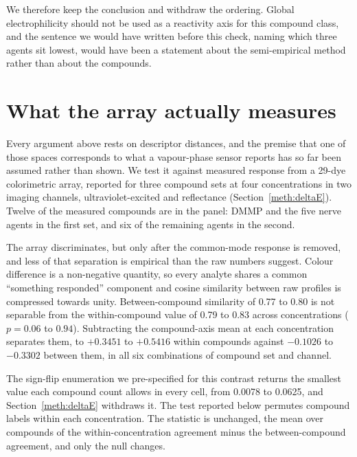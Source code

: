 \documentclass[journal=jacsat,manuscript=suppinfo,margin=1in]{achemso}
\begin{document}
We therefore keep the conclusion and withdraw the ordering. Global
electrophilicity should not be used as a reactivity axis for this compound
class, and the sentence we would have written before this check, naming which
three agents sit lowest, would have been a statement about the semi-empirical
method rather than about the compounds.

\section{What the array actually measures}
\label{res:arraydetail}

Every argument above rests on descriptor distances, and the premise that one of
those spaces corresponds to what a vapour-phase sensor reports has so far been
assumed rather than shown. We test it against measured response from a
29-dye colorimetric array, reported for three compound sets at four
concentrations in two imaging channels, ultraviolet-excited and reflectance
(Section~\ref{meth:deltaE}). Twelve of the measured compounds are in the panel:
DMMP and the five nerve agents in the first set, and six of the remaining agents
in the second.

The array discriminates, but only after the common-mode response is removed, and
less of that separation is empirical than the raw numbers suggest. Colour
difference is a non-negative quantity, so every analyte shares a common
``something responded'' component and cosine similarity between raw profiles is
compressed towards unity. Between-compound similarity of 0.77 to 0.80 is not
separable from the within-compound value of 0.79 to 0.83 across concentrations
($p = 0.06$ to $0.94$). Subtracting the compound-axis mean at each concentration
separates them, to $+0.3451$ to $+0.5416$ within compounds against $-0.1026$ to
$-0.3302$ between them, in all six combinations of compound set and channel.

The sign-flip enumeration we pre-specified for this contrast returns the
smallest value each compound count allows in every cell, from 0.0078 to 0.0625,
and Section~\ref{meth:deltaE} withdraws it. The test reported below permutes
compound labels within each concentration. The statistic is unchanged, the mean
over compounds of the within-concentration agreement minus the
between-compound agreement, and only the null changes.

\begin{table}[!htb]
\centering
\caption{Premise test under the label-permutation null. The statistic is the
mean over compounds of (agreement with itself across concentrations) minus
(agreement with the other compounds' consensus patterns). The null permutes
compound labels within each concentration. Fixing the first concentration's
labels leaves $(n!)^{C-1}$ distinct relabellings, which is enumerable for the
four-compound set and sampled for the others.}
\label{tab:premisenull}

\end{table}
\end{document}
